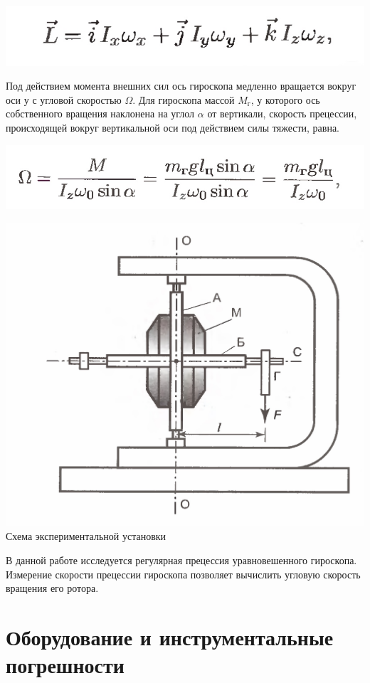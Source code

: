 \documentclass[a4paper,12pt]{article} %
\begin{document}
\begin{center}

  \includegraphics[width=0.4\linewidth]{IMG_2.jpg}\\
 
 \end{center}

Под действием момента внешних сил ось гироскопа медленно вращается вокруг оси у с угловой скоростью $\Omega$. Для гироскопа  массой $M_г$, у которого ось собственного вращения наклонена на углол $\alpha$ от вертикали, скорость прецессии, происходящей вокруг вертикальной оси под действием силы тяжести, равна. 

\begin{center}
  \includegraphics[width=0.4\linewidth]{IMG_3.jpg}\\
 
 \end{center}

\begin{center}

  \includegraphics[width=0.5\linewidth]{IMG_4.jpg}\\
 
  Схема экспериментальной установки\\
 
 \end{center}

В данной работе исследуется регулярная прецессия уравновешенного гироскопа. 
Измерение скорости прецессии гироскопа позволяет вычислить угловую скорость вращения его ротора. 

\section{Оборудование и инструментальные погрешности}
\end{document}
